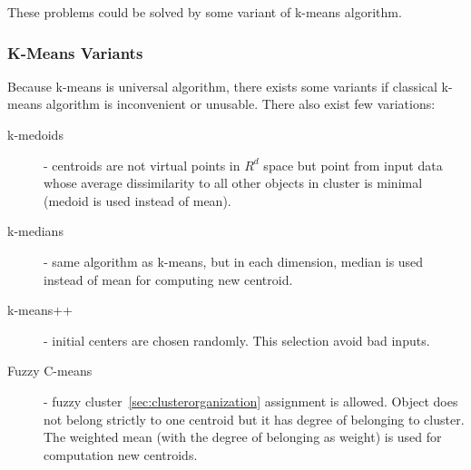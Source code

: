 These problems could be solved by some variant of k-means algorithm.

\subsubsection{K-Means Variants}
Because k-means is universal algorithm, there exists some variants if classical k-means algorithm is inconvenient or unusable.
There also exist few variations:
\begin{description}
\item[k-medoids] - centroids are not virtual points in $R^d$ space but point from input data whose average dissimilarity to all other objects in cluster is minimal (medoid is used instead of mean).
\item[k-medians] - same algorithm as k-means, but in each dimension, median is used instead of mean for computing new centroid.
\item[k-means++] - initial centers are chosen randomly. This selection avoid bad inputs.
\item[Fuzzy C-means] - fuzzy cluster~\ref{sec:clusterorganization} assignment is allowed. Object does not belong strictly to one centroid but it has degree of belonging to cluster. The weighted mean (with the degree of belonging as weight) is used for computation new centroids.
\end{description}
